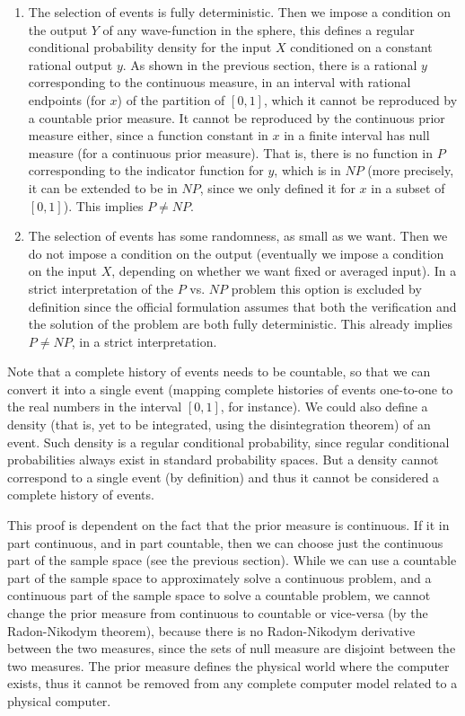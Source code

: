 \documentclass[11pt,a4paper]{report}
\begin{document}
\begin{enumerate}
\item
  The selection of events is fully deterministic. Then we impose a
  condition on the output \(Y\) of any wave-function in the sphere, this
  defines a regular conditional probability density for the input \(X\)
  conditioned on a constant rational output \(y\). As shown in the
  previous section, there is a rational \(y\) corresponding to the
  continuous measure, in an interval with rational endpoints (for \(x\))
  of the partition of \([0,1]\), which it cannot be reproduced by a
  countable prior measure. It cannot be reproduced by the continuous
  prior measure either, since a function constant in \(x\) in a finite
  interval has null measure (for a continuous prior measure). That is,
  there is no function in \(P\) corresponding to the indicator function
  for \(y\), which is in \(NP\) (more precisely, it can be extended to
  be in \(NP\), since we only defined it for \(x\) in a subset of
  \([0,1]\)). This implies \(P\neq NP\).
\item
  The selection of events has some randomness, as small as we want. Then
  we do not impose a condition on the output (eventually we impose a
  condition on the input \(X\), depending on whether we want fixed or
  averaged input). In a strict interpretation of the \(P\) vs. \(NP\)
  problem this option is excluded by definition since the official
  formulation assumes that both the verification and the solution of the
  problem are both fully deterministic. This already implies
  \(P\neq NP\), in a strict interpretation.
\end{enumerate}

Note that a complete history of events needs to be countable, so that we
can convert it into a single event (mapping complete histories of events
one-to-one to the real numbers in the interval \([0,1]\), for instance).
We could also define a density (that is, yet to be integrated, using the
disintegration
theorem\cite{chang1997conditioning}) of an event. Such density is a regular conditional probability,
since regular conditional probabilities always exist in standard
probability
spaces\cite{durrett2019probability}.
But a density cannot correspond to a single event (by definition) and
thus it cannot be considered a complete history of events.

This proof is dependent on the fact that the prior measure is
continuous. If it in part continuous, and in part countable, then we can
choose just the continuous part of the sample space (see the previous
section). While we can use a countable part of the sample space to
approximately solve a continuous problem, and a continuous part of the
sample space to solve a countable problem, we cannot change the prior
measure from continuous to countable or vice-versa (by the Radon-Nikodym
theorem), because there is no Radon-Nikodym derivative between the two
measures, since the sets of null measure are disjoint between the two
measures. The prior measure defines the physical world where the
computer exists, thus it cannot be removed from any complete computer
model related to a physical computer.
\end{document}
